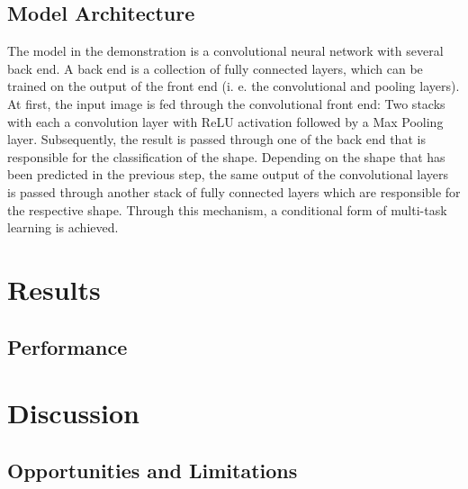 \documentclass[12pt, a4paper, titlepage]{report}
\begin{document}
\section{Model Architecture}

The model in the demonstration is a convolutional neural network with several back end. A back end is a collection of fully connected layers, which can be trained on the output of the front end (i. e. the convolutional and pooling layers). At first, the input image is fed through the convolutional front end: Two stacks with each a convolution layer with ReLU activation followed by a Max Pooling layer. Subsequently, the result is passed through one of the back end that is responsible for the classification of the shape. Depending on the shape that has been predicted in the previous step, the same output of the convolutional layers is passed through another stack of fully connected layers which are responsible for the respective shape. Through this mechanism, a conditional form of multi-task learning is achieved.




\chapter{Results}

\section{Performance}




\chapter{Discussion}

\section{Opportunities and Limitations}
\end{document}
